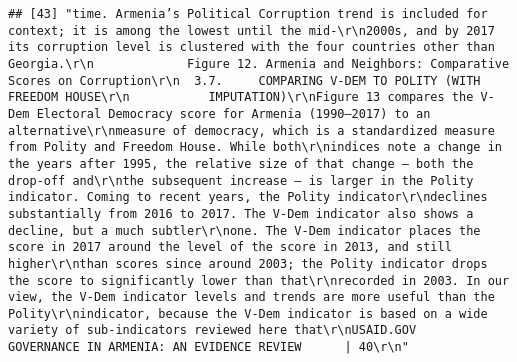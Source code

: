 \documentclass[
]{article}
\begin{document}
\begin{verbatim}
## [43] "time. Armenia’s Political Corruption trend is included for context; it is among the lowest until the mid-\r\n2000s, and by 2017 its corruption level is clustered with the four countries other than Georgia.\r\n             Figure 12. Armenia and Neighbors: Comparative Scores on Corruption\r\n  3.7.     COMPARING V-DEM TO POLITY (WITH FREEDOM HOUSE\r\n           IMPUTATION)\r\nFigure 13 compares the V-Dem Electoral Democracy score for Armenia (1990–2017) to an alternative\r\nmeasure of democracy, which is a standardized measure from Polity and Freedom House. While both\r\nindices note a change in the years after 1995, the relative size of that change — both the drop-off and\r\nthe subsequent increase — is larger in the Polity indicator. Coming to recent years, the Polity indicator\r\ndeclines substantially from 2016 to 2017. The V-Dem indicator also shows a decline, but a much subtler\r\none. The V-Dem indicator places the score in 2017 around the level of the score in 2013, and still higher\r\nthan scores since around 2003; the Polity indicator drops the score to significantly lower than that\r\nrecorded in 2003. In our view, the V-Dem indicator levels and trends are more useful than the Polity\r\nindicator, because the V-Dem indicator is based on a wide variety of sub-indicators reviewed here that\r\nUSAID.GOV                                                  GOVERNANCE IN ARMENIA: AN EVIDENCE REVIEW      | 40\r\n"                                                                                                                                                                                                                                                                                                                                                                                                                                                                                                                                                                                                                                                                                                                                                                                                                                                                                                                                                                                                                                                                                                                                                                                                                                                                                                                                                                                                                                                                                                                                                                                                                                                                                                                                                                                                                                                                                                                                                 
\end{verbatim}
\end{document}
